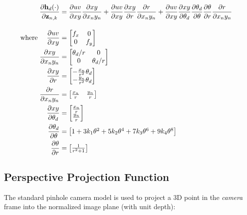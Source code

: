 \begin{align*} \frac{\partial \mathbf h_d(\cdot)}{\partial \mathbf{z}_{n,k}} &= \frac{\partial uv}{\partial xy}\frac{\partial xy}{\partial x_ny_n}+ \frac{\partial uv}{\partial xy}\frac{\partial xy}{\partial r}\frac{\partial r}{\partial x_ny_n}+ \frac{\partial uv}{\partial xy}\frac{\partial xy}{\partial \theta_d}\frac{\partial \theta_d}{\partial \theta}\frac{\partial \theta}{\partial r}\frac{\partial r}{\partial x_ny_n} \\[1em] \empty {\rm where}~~~~ \frac{\partial uv}{\partial xy} &= \begin{bmatrix} f_x & 0 \\ 0 & f_y \end{bmatrix} \\ \empty \frac{\partial xy}{\partial x_ny_n} &= \begin{bmatrix} \theta_d/r & 0 \\ 0 & \theta_d/r \end{bmatrix} \\ \empty \frac{\partial xy}{\partial r} &= \begin{bmatrix} -\frac{x_n}{r^2}\theta_d \\ -\frac{y_n}{r^2}\theta_d \end{bmatrix} \\ \empty \frac{\partial r}{\partial x_ny_n} &= \begin{bmatrix} \frac{x_n}{r} & \frac{y_n}{r} \end{bmatrix} \\ \empty \frac{\partial xy}{\partial \theta_d} &= \begin{bmatrix} \frac{x_n}{r} \\ \frac{y_n}{r} \end{bmatrix} \\ \empty \frac{\partial \theta_d}{\partial \theta} &= \begin{bmatrix} 1 + 3k_1 \theta^2 + 5k_2 \theta^4 + 7k_3 \theta^6 + 9k_4 \theta^8\end{bmatrix} \\ \empty \frac{\partial \theta}{\partial r} &= \begin{bmatrix} \frac{1}{r^2+1} \end{bmatrix} \end{align*}\hypertarget{update-feat_projection}{}\subsection{Perspective Projection Function}\label{update-feat_projection}
The standard pinhole camera model is used to project a 3D point in the {\itshape camera} frame into the normalized image plane (with unit depth)\+:

